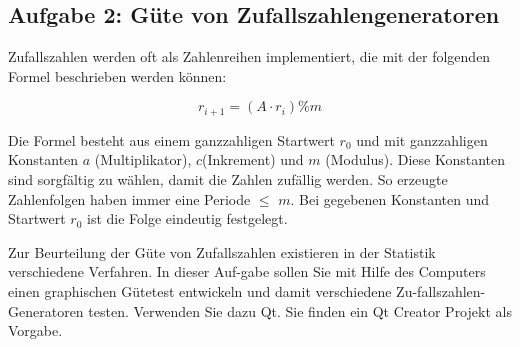 \subsection{Aufgabe 2: Güte von Zufallszahlengeneratoren}
Zufallszahlen werden oft als Zahlenreihen implementiert, die mit der folgenden Formel beschrieben werden können:

\begin{equation}
  r_{i+1} = (A \cdot r_i) \% m
\end{equation}

Die Formel besteht aus einem ganzzahligen Startwert $r_0$ und mit ganzzahligen Konstanten $a$ (Multiplikator), $c $(Inkrement) und $m$ (Modulus). Diese Konstanten sind sorgfältig zu wählen, damit die Zahlen zufällig werden. So erzeugte Zahlenfolgen haben immer eine Periode $\leq$ $m$. Bei gegebenen Konstanten und Startwert $r_0$ ist die Folge eindeutig festgelegt.


Zur Beurteilung der Güte von Zufallszahlen existieren in der Statistik verschiedene Verfahren. In dieser Auf-gabe sollen Sie mit Hilfe des Computers einen graphischen Gütetest entwickeln und damit verschiedene Zu-fallszahlen-Generatoren testen. Verwenden Sie dazu Qt. Sie finden ein Qt Creator Projekt als Vorgabe.

